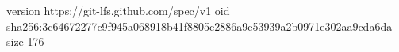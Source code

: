 version https://git-lfs.github.com/spec/v1
oid sha256:3c64672277c9f945a068918b41f8805c2886a9e53939a2b0971e302aa9cda6da
size 176
